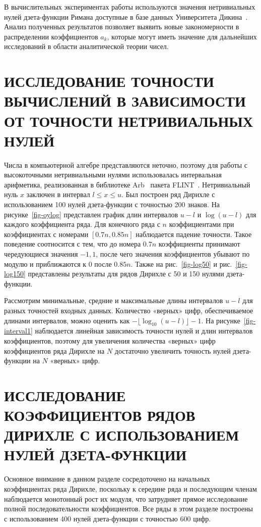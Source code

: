 \documentclass[intlimits,twoside,a4paper,11pt]{article}
\begin{document}
        В вычислительных экспериментах работы используются значения нетривиальных нулей дзета-функции Римана доступные в базе данных Университета Дикина~\cite{pavlov}. 
        Анализ полученных результатов позволяет выявить новые закономерности в 
        распределении коэффициентов $a_k$, которые могут иметь значение для дальнейших исследований в области аналитической теории чисел.


    \section{ИССЛЕДОВАНИЕ ТОЧНОСТИ ВЫЧИСЛЕНИЙ В ЗАВИСИМОСТИ ОТ ТОЧНОСТИ НЕТРИВИАЛЬНЫХ НУЛЕЙ}
        Числа в компьютерной алгебре представляются неточно, поэтому для работы с высокоточными нетривиальными нулями 
        использовалась интервальная арифметика, реализованная в библиотеке Arb~\cite{iers2010} пакета FLINT~\cite{standish}. 
        Нетривиальный нуль $x$ заключен в интервал $l \leqslant x \leqslant u$. 
        Был построен ряд Дирихле с использованием 100 нулей дзета-функции с точностью 200 знаков. 
        На рисунке~\ref{fig-oylog} представлен график длин интервалов $u-l$ и $\log(u-l)$ для каждого коэффициента ряда. 
        Для конечного ряда с $n$ коэффициентами при коэффициентах с номерами $[0.7n, 0.85n]$ наблюдается падение точности. 
        Такое поведение соотносится с тем, что до номера $0.7n$ коэффициенты принимают чередующиеся значения ${-1, 1}$, после чего значения коэффициентов убывают по модулю и приближаются к 0 после $0.85n$. 
        Также на рис.~\ref{fig-log50} и рис.~\ref{fig-log150} представлены результаты для рядов Дирихле с 50 и 150 нулями дзета-функции. 


        

            Рассмотрим минимальные, средние и максимальные длины интервалов $u-l$ для разных точностей входных данных. 
            Количество «верных» цифр, обеспечиваемое длинами интервалов, можно оценить как $-\lfloor\log_{10}(u - l)\rfloor - 1$. 
            На рисунке~\ref{fig-interval1} наблюдается линейная зависимость точности нулей и длин интервалов коэффициентов, 
            поэтому для увеличения количества «верных» цифр коэффициентов ряда Дирихле на $N$ достаточно увеличить точность нулей дзета-функции на $N$ «верных» цифр. 


        


    \section{ИССЛЕДОВАНИЕ КОЭФФИЦИЕНТОВ РЯДОВ ДИРИХЛЕ С ИСПОЛЬЗОВАНИЕМ НУЛЕЙ ДЗЕТА-ФУНКЦИИ}  
        Основное внимание в данном разделе сосредоточено на начальных коэффициентах ряда Дирихле, 
        поскольку к середине ряда и последующим членам наблюдается монотонный рост их модуля, 
        что затрудняет прямое исследование полной последовательности коэффициентов.
        Все ряды в этом разделе построены с использованием 400 нулей дзета-функции с точностью 600 цифр. 
\end{document}
